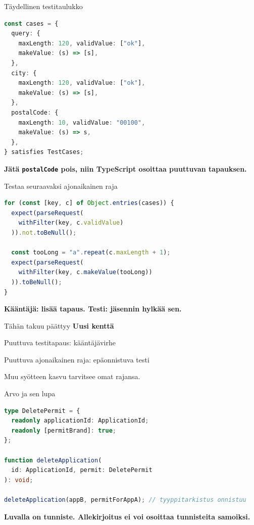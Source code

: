 \documentclass[10pt,aspectratio=169]{beamer}
\newcommand{\bottomline}[2][DeckAccent]{%
  \vfill{\color{#1}\large\bfseries #2}\par
}
\begin{document}
\begin{frame}[fragile]{Täydellinen testitaulukko}
\begin{lstlisting}[style=deckcode,language=TypeScript,basicstyle=\ttfamily\footnotesize\color{DeckText}]
const cases = {
  query: {
    maxLength: 120, validValue: ["ok"],
    makeValue: (s) => [s],
  },
  city: {
    maxLength: 120, validValue: ["ok"],
    makeValue: (s) => [s],
  },
  postalCode: {
    maxLength: 10, validValue: "00100",
    makeValue: (s) => s,
  },
} satisfies TestCases;
\end{lstlisting}
  \bottomline{Jätä \texttt{postalCode} pois, niin TypeScript osoittaa puuttuvan tapauksen.}
\end{frame}

\begin{frame}[fragile]{Testaa seuraavaksi ajonaikainen raja}
\begin{lstlisting}[style=deckcode,language=TypeScript]
for (const [key, c] of Object.entries(cases)) {
  expect(parseRequest(
    withFilter(key, c.validValue)
  )).not.toBeNull();

  const tooLong = "a".repeat(c.maxLength + 1);
  expect(parseRequest(
    withFilter(key, c.makeValue(tooLong))
  )).toBeNull();
}
\end{lstlisting}
  \bottomline{Kääntäjä: lisää tapaus. Testi: jäsennin hylkää sen.}
\end{frame}

\begin{frame}{Tähän takuu päättyy}
  \vspace{7mm}
  {\Large\bfseries Uusi kenttä}\par
  \vspace{7mm}
  {\color{DeckRed}\Large Puuttuva testitapaus: kääntäjävirhe}\par
  \vspace{7mm}
  {\color{DeckAccent}\Large Puuttuva ajonaikainen raja: epäonnistuva testi}\par
  \vfill
  {\color{DeckMuted}\Large Muu syötteen kasvu tarvitsee omat rajansa.}
\end{frame}

\begin{frame}[fragile]{Arvo ja sen lupa}
\begin{lstlisting}[style=deckcode,language=TypeScript]
type DeletePermit = {
  readonly applicationId: ApplicationId;
  readonly [permitBrand]: true;
};

function deleteApplication(
  id: ApplicationId, permit: DeletePermit
): void;

deleteApplication(appB, permitForAppA); // tyyppitarkistus onnistuu
\end{lstlisting}
  \bottomline[DeckRed]{Luvalla on tunniste. Allekirjoitus ei voi osoittaa tunnisteita samoiksi.}
\end{frame}
\end{document}
